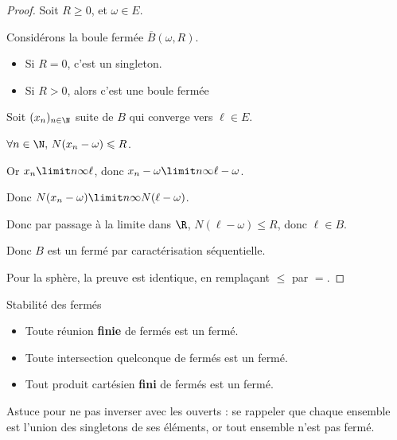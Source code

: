 \begin{proof}
    Soit $R \geqslant 0$, et $\omega \in E$.

    Considérons la boule fermée $\overline{B}(\omega, R)$.

    \begin{itemize}
        \item Si $R = 0$, c'est un singleton. 
        \item Si $R > 0$, alors c'est une boule fermée
    \end{itemize}

    Soit $(x_n)_{n \in \N}$ suite de $B$ qui converge vers $\ell \in E$.

    $\forall n \in \N, \, N(x_n - \omega) \leqslant R$.

    Or $x_n \limit n \infty \ell$, donc $x_n - \omega \limit n \infty \ell - \omega$.

    Donc $N(x_n - \omega) \limit n \infty N(\ell - \omega)$.

    Donc par passage à la limite dans $\R$, $N(\ell - \omega ) \leqslant R$, donc $\ell \in B$.

    Donc $B$ est un fermé par caractérisation séquentielle.

    Pour la sphère, la preuve est identique, en remplaçant $\leqslant$ par $=$.
\end{proof}

\begin{proposition}{Stabilité des fermés}{}
    \begin{itemize}
        \item Toute réunion \textbf{finie} de fermés est un fermé.
        \item Toute intersection quelconque de fermés est un fermé.
        \item Tout produit cartésien \textbf{fini} de fermés est un fermé.
    \end{itemize}
\end{proposition}

Astuce pour ne pas inverser avec les ouverts : se rappeler que chaque ensemble est l'union des singletons 
de ses éléments, or tout ensemble n'est pas fermé. 

